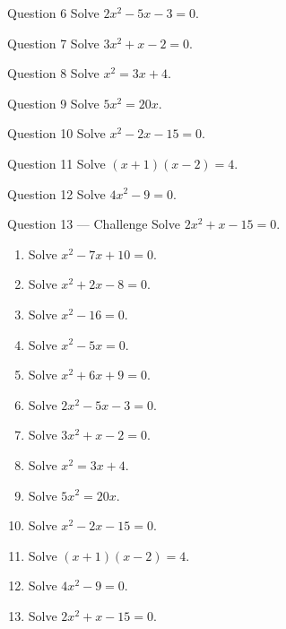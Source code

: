 \documentclass[11pt]{article}
\begin{document}
\begin{qbox}{Question 6}
Solve $2x^2-5x-3=0$.\workspace{2.2cm}
\end{qbox}

\begin{qbox}{Question 7}
Solve $3x^2+x-2=0$.\workspace{2.2cm}
\end{qbox}

\begin{qbox}{Question 8}
Solve $x^2=3x+4$.\workspace{2.0cm}
\end{qbox}

\begin{qbox}{Question 9}
Solve $5x^2=20x$.\workspace{1.8cm}
\end{qbox}

\begin{qbox}{Question 10}
Solve $x^2-2x-15=0$.\workspace{2.0cm}
\end{qbox}

\begin{qbox}{Question 11}
Solve $(x+1)(x-2)=4$.\workspace{2.4cm}
\end{qbox}

\begin{qbox}{Question 12}
Solve $4x^2-9=0$.\workspace{2.0cm}
\end{qbox}

\begin{qbox}{Question 13 --- Challenge}
Solve $2x^2+x-15=0$.\workspace{2.4cm}
\end{qbox}

\clearpage
{}

\begin{recapbox}
\begin{multicols}{2}
\small
\begin{enumerate}[leftmargin=*,itemsep=3pt]
  \item Solve $x^2-7x+10=0$.
  \item Solve $x^2+2x-8=0$.
  \item Solve $x^2-16=0$.
  \item Solve $x^2-5x=0$.
  \item Solve $x^2+6x+9=0$.
  \item Solve $2x^2-5x-3=0$.
  \item Solve $3x^2+x-2=0$.
  \item Solve $x^2=3x+4$.
  \item Solve $5x^2=20x$.
  \item Solve $x^2-2x-15=0$.
  \item Solve $(x+1)(x-2)=4$.
  \item Solve $4x^2-9=0$.
  \item Solve $2x^2+x-15=0$.
\end{enumerate}
\end{multicols}
\end{recapbox}
\end{document}
